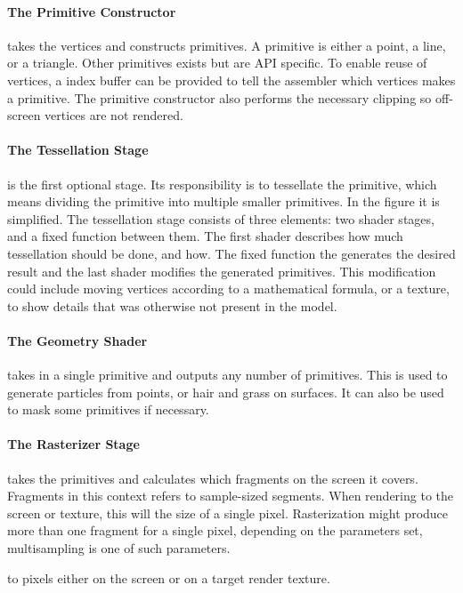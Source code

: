 \paragraph{The Primitive Constructor} takes the vertices and constructs primitives.
A primitive is either a point, a line, or a triangle.
Other primitives exists but are \gls{API} specific.
To enable reuse of vertices, a index buffer can be provided to tell the assembler which vertices makes a primitive.
The primitive constructor also performs the necessary clipping so off-screen vertices are not rendered.

\paragraph{The Tessellation Stage} is the first optional stage.
Its responsibility is to tessellate the primitive, which means dividing the primitive into multiple smaller primitives.
In the figure it is simplified.
The tessellation stage consists of three elements: two shader stages, and a fixed function between them.
The first shader describes how much tessellation should be done, and how.
The fixed function the generates the desired result and the last shader modifies the generated primitives.
This modification could include moving vertices according to a mathematical formula, or a texture, to show details that was otherwise not present in the model.

\paragraph{The Geometry Shader} takes in a single primitive and outputs any number of primitives.
This is used to generate particles from points, or hair and grass on surfaces.
It can also be used to mask some primitives if necessary.


\paragraph{The Rasterizer Stage} takes the primitives and calculates which fragments on the screen it covers.
Fragments in this context refers to sample-sized segments.
When rendering to the screen or texture, this will the size of a single pixel.
Rasterization might produce more than one fragment for a single pixel, depending on the parameters set, multisampling is one of such parameters.

 to pixels either on the screen or on a target render texture.


